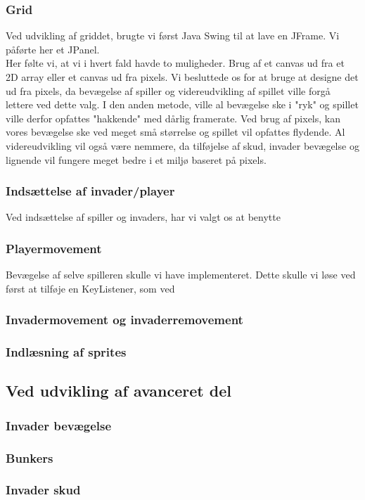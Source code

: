 \documentclass[a4paper,12pt]{article}
\begin{document}
\subsubsection{Grid}
Ved udvikling af griddet, brugte vi først Java Swing til at lave en JFrame. Vi påførte her et JPanel.\\
Her følte vi, at vi i hvert fald havde to muligheder. Brug af et canvas ud fra et 2D array eller et canvas ud fra pixels. Vi besluttede os for at bruge at designe det ud  fra pixels, da bevægelse af spiller og videreudvikling af spillet ville forgå lettere ved dette valg. I den anden metode, ville al bevægelse ske i "ryk" og spillet ville derfor opfattes "hakkende" med dårlig framerate. Ved brug af pixels, kan vores bevægelse ske ved meget små størrelse og spillet vil opfattes flydende. Al videreudvikling vil også være nemmere, da tilføjelse af skud, invader bevægelse og lignende vil fungere meget bedre i et miljø baseret på pixels.
\subsubsection{Indsættelse af invader/player}
Ved indsættelse af spiller og invaders, har vi valgt os at benytte 
\subsubsection{Playermovement}
Bevægelse af selve spilleren skulle vi have implementeret. Dette skulle vi løse ved først at tilføje en KeyListener, som ved 
\subsubsection{Invadermovement og invaderremovement}
\subsubsection{Indlæsning af sprites}
\subsection{Ved udvikling af avanceret del}
\subsubsection{Invader bevægelse}
\subsubsection{Bunkers}
\subsubsection{Invader skud}
\end{document}
